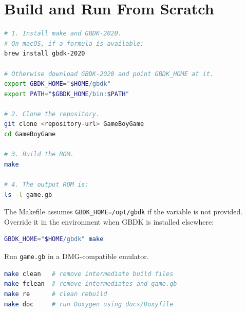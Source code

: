 \section{Build and Run From Scratch}

\begin{lstlisting}[language=bash,caption={Build from a fresh machine}]
# 1. Install make and GBDK-2020.
# On macOS, if a formula is available:
brew install gbdk-2020

# Otherwise download GBDK-2020 and point GBDK_HOME at it.
export GBDK_HOME="$HOME/gbdk"
export PATH="$GBDK_HOME/bin:$PATH"

# 2. Clone the repository.
git clone <repository-url> GameBoyGame
cd GameBoyGame

# 3. Build the ROM.
make

# 4. The output ROM is:
ls -l game.gb
\end{lstlisting}

The Makefile assumes \texttt{GBDK\_HOME=/opt/gbdk} if the variable is not provided. Override it in the environment when GBDK is installed elsewhere:

\begin{lstlisting}[language=bash,caption={Build with an explicit GBDK path}]
GBDK_HOME="$HOME/gbdk" make
\end{lstlisting}

Run \texttt{game.gb} in a DMG-compatible emulator.

\begin{lstlisting}[language=bash,caption={Maintenance commands}]
make clean   # remove intermediate build files
make fclean  # remove intermediates and game.gb
make re      # clean rebuild
make doc     # run Doxygen using docs/Doxyfile
\end{lstlisting}
